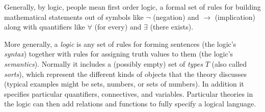 \documentclass[12pt]{article}
\begin{document}
Generally, by logic, people mean first order logic, a formal set of rules for building mathematical statements out of symbols like $\neg$ (negation) and $\rightarrow$ (implication) along with quantifiers like $\forall$ (for every) and $\exists$ (there exists).

More generally, a \emph{logic} is any set of rules for forming sentences (the logic's \emph{syntax}) together with rules for assigning truth values to them (the logic's \emph{semantics}).  Normally it includes a (possibly empty) set of \emph{types} $T$ (also called \emph{sorts}), which represent the different kinds of objects that the theory discusses (typical examples might be sets, numbers, or sets of numbers).  In addition it specifies particular quantifiers, connectives, and variables.  Particular theories in the logic can then add relations and functions to fully specify a logical language.
\end{document}
